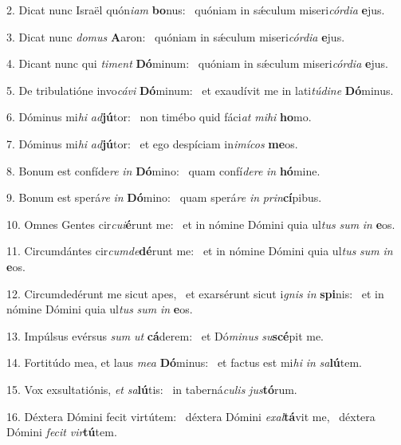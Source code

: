 2. Dicat nunc Israël quón\textit{i}\textit{am} \textbf{bo}nus: \ast\  quóniam in sǽculum miseri\textit{cór}\textit{di}\textit{a} \textbf{e}jus.\

3. Dicat nunc \textit{do}\textit{mus} \textbf{A}aron: \ast\  quóniam in sǽculum miseri\textit{cór}\textit{di}\textit{a} \textbf{e}jus.\

4. Dicant nunc qui \textit{ti}\textit{ment} \textbf{Dó}minum: \ast\  quóniam in sǽculum miseri\textit{cór}\textit{di}\textit{a} \textbf{e}jus.\

5. De tribulatióne invo\textit{cá}\textit{vi} \textbf{Dó}minum: \ast\  et exaudívit me in lati\textit{tú}\textit{di}\textit{ne} \textbf{Dó}minus.\

6. Dóminus mi\textit{hi} \textit{ad}\textbf{jú}tor: \ast\  non timébo quid fáci\textit{at} \textit{mi}\textit{hi} \textbf{ho}mo.\

7. Dóminus mi\textit{hi} \textit{ad}\textbf{jú}tor: \ast\  et ego despíciam in\textit{i}\textit{mí}\textit{cos} \textbf{me}os.\

8. Bonum est confíde\textit{re} \textit{in} \textbf{Dó}mino: \ast\  quam confí\textit{de}\textit{re} \textit{in} \textbf{hó}mine.\

9. Bonum est sperá\textit{re} \textit{in} \textbf{Dó}mino: \ast\  quam sperá\textit{re} \textit{in} \textit{prin}\textbf{cí}pibus.\

10. Omnes Gentes cir\textit{cu}\textit{i}\textbf{é}runt me: \ast\  et in nómine Dómini quia ul\textit{tus} \textit{sum} \textit{in} \textbf{e}os.\

11. Circumdántes cir\textit{cum}\textit{de}\textbf{dé}runt me: \ast\  et in nómine Dómini quia ul\textit{tus} \textit{sum} \textit{in} \textbf{e}os.\

12. Circumdedérunt me sicut apes, \dag\  et exarsérunt sicut i\textit{gnis} \textit{in} \textbf{spi}nis: \ast\  et in nómine Dómini quia ul\textit{tus} \textit{sum} \textit{in} \textbf{e}os.\

13. Impúlsus evérsus \textit{sum} \textit{ut} \textbf{cá}derem: \ast\  et Dó\textit{mi}\textit{nus} \textit{su}\textbf{scé}pit me.\

14. Fortitúdo mea, et laus \textit{me}\textit{a} \textbf{Dó}minus: \ast\  et factus est mi\textit{hi} \textit{in} \textit{sa}\textbf{lú}tem.\

15. Vox exsultatiónis, \textit{et} \textit{sa}\textbf{lú}tis: \ast\  in taberná\textit{cu}\textit{lis} \textit{jus}\textbf{tó}rum.\

16. Déxtera Dómini fecit virtútem: \dag\  déxtera Dómini \textit{ex}\textit{al}\textbf{tá}vit me, \ast\  déxtera Dómini \textit{fe}\textit{cit} \textit{vir}\textbf{tú}tem.\

